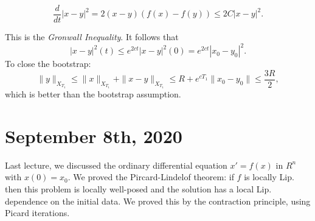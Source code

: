 \documentclass[12pt]{scrartcl}
\begin{document}
$$\frac{d}{dt}|x-y|^2 = 2(x-y)(f(x) - f(y)) \le 2C|x-y|^2.$$

This is the \textit{Gronwall Inequality}.  It follows that $$|x-y|^2(t) \le e^{2ct}|x-y|^2(0) = e^{2ct}|x_0 - y_0|^2.$$
To close the bootstrap:
$$\|y\|_{X_{T_1}} \le \|x\|_{X_{T_1}} + \|x-y\|_{X_{T_1}} \le R + e^{cT_1}\|x_0 - y_0\| \le \frac{3R}{2},$$
which is better than the bootstrap assumption.
\section{September 8th, 2020}
Last lecture, we discussed the ordinary differential equation $x' = f(x)$ in $R^n$ with $x(0) = x_0$.  
We proved the Pircard-Lindelof theorem: if $f$ is locally Lip. then this problem is locally well-posed and the solution has a local Lip. dependence on the initial data.  We proved this by the contraction principle, using Picard iterations.
\end{document}
